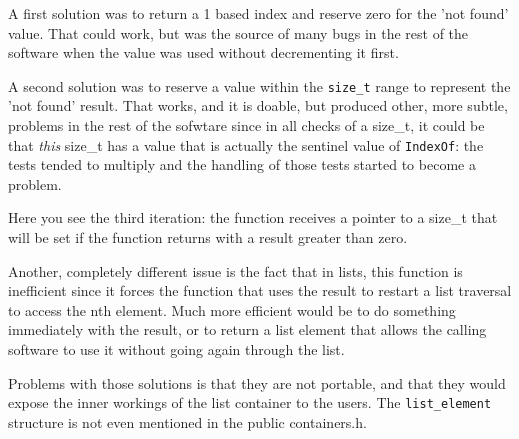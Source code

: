 \documentclass[12pt,a4paper]{memoir} %
\begin{document}
{{A first solution was to return a 1 based index and reserve zero for the 'not found' value. That could work, but was the source of many bugs in the rest of the software when the value was used without decrementing it first. 

A second solution was to reserve a value within the \texttt{size\_t} range to represent the 'not found' result. That works, and it is doable, but produced other, more subtle, problems in the rest of the sofwtare since in all checks of a size\_t, it could be that \textsl{this} size\_t has a value that is actually the sentinel value of \texttt{IndexOf}: the tests tended to multiply and the handling of those tests started to become a problem.

Here you see the third iteration: the function receives a pointer to a size\_t that will be set if the function returns with a result greater than zero.

Another, completely different issue is the fact that in lists, this function is inefficient since it forces the function that uses the result to restart a list traversal to access the nth element. Much more efficient would be to do something immediately with the result, or to return a list element that allows the calling software to use it without going again through the list. 

Problems with those solutions is that they are not portable, and that they would expose the inner workings of the list container to the users. The \texttt{list\_element} structure is not even mentioned in the public containers.h.

}}
\end{document}
